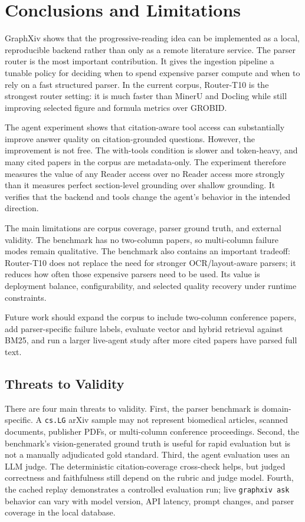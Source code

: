 \documentclass[10pt]{article}
\begin{document}
\section{Conclusions and Limitations}

GraphXiv shows that the progressive-reading idea can be implemented as a local, reproducible backend rather than only as a remote literature service. The parser router is the most important contribution. It gives the ingestion pipeline a tunable policy for deciding when to spend expensive parser compute and when to rely on a fast structured parser. In the current corpus, Router-T10 is the strongest router setting: it is much faster than MinerU and Docling while still improving selected figure and formula metrics over GROBID.

The agent experiment shows that citation-aware tool access can substantially improve answer quality on citation-grounded questions. However, the improvement is not free. The with-tools condition is slower and token-heavy, and many cited papers in the corpus are metadata-only. The experiment therefore measures the value of any Reader access over no Reader access more strongly than it measures perfect section-level grounding over shallow grounding. It verifies that the backend and tools change the agent's behavior in the intended direction.

The main limitations are corpus coverage, parser ground truth, and external validity. The benchmark has no two-column papers, so multi-column failure modes remain qualitative. The benchmark also contains an important tradeoff: Router-T10 does not replace the need for stronger OCR/layout-aware parsers; it reduces how often those expensive parsers need to be used. Its value is deployment balance, configurability, and selected quality recovery under runtime constraints.

Future work should expand the corpus to include two-column conference papers, add parser-specific failure labels, evaluate vector and hybrid retrieval against BM25, and run a larger live-agent study after more cited papers have parsed full text.

\subsection{Threats to Validity}

There are four main threats to validity. First, the parser benchmark is domain-specific. A \texttt{cs.LG} arXiv sample may not represent biomedical articles, scanned documents, publisher PDFs, or multi-column conference proceedings. Second, the benchmark's vision-generated ground truth is useful for rapid evaluation but is not a manually adjudicated gold standard. Third, the agent evaluation uses an LLM judge. The deterministic citation-coverage cross-check helps, but judged correctness and faithfulness still depend on the rubric and judge model. Fourth, the cached replay demonstrates a controlled evaluation run; live \texttt{graphxiv ask} behavior can vary with model version, API latency, prompt changes, and parser coverage in the local database.
\end{document}

